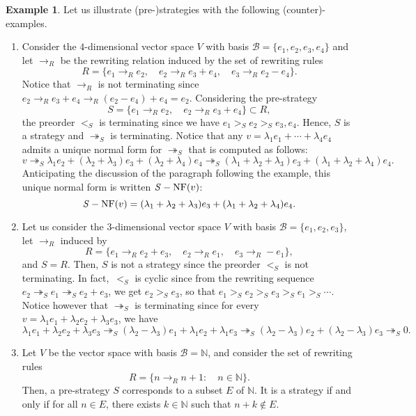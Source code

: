 \documentclass[10pt]{easychair}
\theoremstyle{definition}
\newtheorem{example}[theorem]{Example}
\newcommand\basis{\mathscr{B}}
\newcommand\ordS{<_S}
\newcommand\N{\mathbb{N}}
\newcommand\rewR{\to_R}
\newcommand\parS{\twoheadrightarrow_S}
\DeclareMathOperator{\SNF}{{\it S}-NF}
\begin{document}
\begin{example}\label{ex:strategies_step_1}
  Let us illustrate (pre-)strategies with the following
  (counter)-examples.
  \begin{enumerate}
  \item\label{it:ex_strat_1} Consider the $4$-dimensional vector space
    $V$ with basis $\basis=\{e_1,e_2,e_3,e_4\}$ and let $\rewR$ be the
    rewriting relation induced by the set of rewriting rules
    \[R=\{e_1\rewR e_2,\quad e_2\rewR e_3+e_4,\quad e_3\rewR e_2-e_4\}.\]
    Notice that $\rewR$ is not terminating since
    $e_2\rewR e_3+e_4\rewR(e_2-e_4)+e_4=e_2$. Considering the
    pre-strategy
    \[S=\{e_1\rewR e_2,\quad e_2\rewR e_3+e_4\}\subset R,\]
    the preorder $\ordS$ is terminating since we have
    $e_1>_Se_2>_Se_3,e_4$. Hence, $S$ is a strategy and $\parS$ is
    terminating. Notice that any $v=\lambda_1e_1+\cdots+\lambda_4e_4$ 
    admits a unique normal form for $\parS$ that is computed as follows:
    \[v\parS\lambda_1e_2+(\lambda_2+\lambda_3)e_3+
    (\lambda_2+\lambda_4)e_4\parS(\lambda_1+\lambda_2+\lambda_3)e_3+
    (\lambda_1+\lambda_2+\lambda_4)e_4.\]
    Anticipating the discussion of the paragraph following the example,
    this unique normal form is written $\SNF(v)$:
    \[\SNF(v)=(\lambda_1+\lambda_2+\lambda_3)e_3+
    (\lambda_1+\lambda_2+\lambda_4)e_4.\]
  \item\label{it:c-ex_strat_1} Let us consider the $3$-dimensional vector
    space $V$ with basis $\basis=\{e_1,e_2,e_3\}$, let $\rewR$ induced by
    \[R=\{e_1\rewR e_2+e_3,\quad e_2\rewR e_1,\quad e_3\rewR -e_1\},\]
    and $S=R$. Then, $S$ is not a strategy since the preorder $\ordS$ is
    not terminating. In fact,~$\ordS$ is cyclic since from the rewriting
    sequence $e_2\parS e_1\parS e_2+e_3$, we get $e_2>_Se_3$, so that
    $e_1>_S e_2>_S e_3>_S e_1>_S\cdots$. Notice however that $\parS$ is
    terminating since for every
    $v=\lambda_1e_1+\lambda_2e_2+\lambda_3e_3$, we have
    \[\lambda_1e_1+\lambda_2e_2+\lambda_3e_3\parS(\lambda_2-\lambda_3)e_1
    +\lambda_1e_2+\lambda_1e_3\parS(\lambda_2-\lambda_3)e_2+(\lambda_2-
    \lambda_3)e_3\parS 0.
    \]
  \item\label{it:case_N} Let $V$ be the vector space with basis
    $\basis= \mathbb N$, and consider the set of rewriting rules
    \[R=\{n\rewR n+1:\quad n\in\N\}.\]
    Then, a pre-strategy $S$ corresponds to a subset $E$ of $\mathbb N$.
    It is a strategy if and only if for all $n \in E$, there exists
    $k \in \mathbb N$ such that $n + k \notin E$. 
  \end{enumerate}
\end{example}
\smallskip
\end{document}
